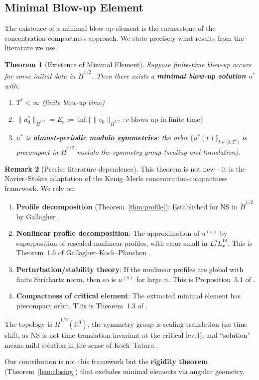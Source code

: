 \documentclass[11pt]{article}
\newtheorem{theorem}{Theorem}[section]
\theoremstyle{definition}
\newtheorem{remark}[theorem]{Remark}
\newcommand{\R}{\mathbb{R}}
\begin{document}
\subsection{Minimal Blow-up Element}

The existence of a minimal blow-up element is the cornerstone of the concentration-compactness approach. We state precisely what results from the literature we use.

\begin{theorem}[Existence of Minimal Element]\label{thm:minimal}
Suppose finite-time blow-up occurs for some initial data in $\dot{H}^{1/2}$. Then there exists a \textbf{minimal blow-up solution} $u^*$ with:
\begin{enumerate}
\item $T^* < \infty$ (finite blow-up time)
\item $\|u^*_0\|_{\dot{H}^{1/2}} = E_c := \inf\{\|v_0\|_{\dot{H}^{1/2}} : v \text{ blows up in finite time}\}$
\item $u^*$ is \textbf{almost-periodic modulo symmetries}: the orbit $\{u^*(t)\}_{t \in [0,T^*)}$ is precompact in $\dot{H}^{1/2}$ modulo the symmetry group (scaling and translation).
\end{enumerate}
\end{theorem}

\begin{remark}[Precise literature dependence]\label{rem:literature}
This theorem is not new---it is the Navier--Stokes adaptation of the Kenig--Merle \cite{KM} concentration-compactness framework. We rely on:
\begin{enumerate}
\item \textbf{Profile decomposition} (Theorem~\ref{thm:profile}): Established for NS in $\dot{H}^{1/2}$ by Gallagher \cite{Gallagher2001}.

\item \textbf{Nonlinear profile decomposition}: The approximation of $u^{(n)}$ by superposition of rescaled nonlinear profiles, with error small in $L^5_t L^{10}_x$. This is Theorem~1.6 of Gallagher--Koch--Planchon \cite{GKP}.

\item \textbf{Perturbation/stability theory}: If the nonlinear profiles are global with finite Strichartz norm, then so is $u^{(n)}$ for large $n$. This is Proposition~3.1 of \cite{GKP}.

\item \textbf{Compactness of critical element}: The extracted minimal element has precompact orbit. This is Theorem~1.3 of \cite{GKP2016}.
\end{enumerate}

The topology is $\dot{H}^{1/2}(\R^3)$, the symmetry group is scaling-translation (no time shift, as NS is not time-translation invariant at the critical level), and ``solution'' means mild solution in the sense of Koch--Tataru \cite{KT}.

Our contribution is not this framework but the \textbf{rigidity theorem} (Theorem~\ref{lem:closing}) that excludes minimal elements via angular geometry.
\end{remark}
\end{document}
